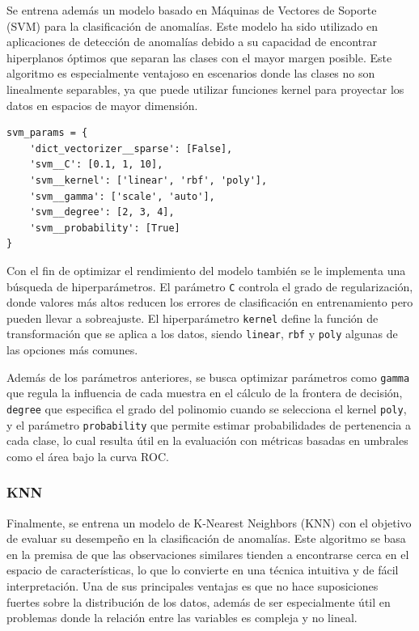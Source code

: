 \documentclass[11pt,a4paper,spanish]{book}
\numberwithin{equation}{chapter}
\numberwithin{figure}{chapter}
\begin{document}
Se entrena además un modelo basado en Máquinas de Vectores de Soporte (SVM) para la 
clasificación de anomalías. Este modelo ha sido utilizado en aplicaciones de detección 
de anomalías debido a su capacidad de encontrar hiperplanos óptimos que separan las 
clases con el mayor margen posible. Este algoritmo es especialmente ventajoso en 
escenarios donde las clases no son linealmente separables, ya que puede utilizar 
funciones kernel para proyectar los datos en espacios de mayor dimensión. 


\vspace{5mm}
\begin{lstlisting}
svm_params = {
    'dict_vectorizer__sparse': [False],
    'svm__C': [0.1, 1, 10],                  
    'svm__kernel': ['linear', 'rbf', 'poly'],
    'svm__gamma': ['scale', 'auto'],         
    'svm__degree': [2, 3, 4],                
    'svm__probability': [True]               
}
\end{lstlisting}


Con el fin de optimizar el rendimiento del modelo también se le implementa una búsqueda 
de hiperparámetros. El parámetro \lstinline|C| controla el grado de regularización, 
donde valores más altos reducen los errores de clasificación en entrenamiento pero 
pueden llevar a sobreajuste. El hiperparámetro \lstinline|kernel| define la función de 
transformación que se aplica a los datos, siendo \lstinline|linear|, \lstinline|rbf| y 
\lstinline|poly| algunas de las opciones más comunes. 


Además de los parámetros anteriores, se busca optimizar parámetros como 
\lstinline|gamma| que regula la influencia de cada muestra en el cálculo de la frontera 
de decisión, \lstinline|degree| que especifica el grado del polinomio cuando se 
selecciona el kernel \lstinline|poly|, y el parámetro \lstinline|probability| que 
permite estimar probabilidades de pertenencia a cada clase, lo cual resulta útil en la 
evaluación con métricas basadas en umbrales como el área bajo la curva ROC. 


\subsubsection{KNN}


Finalmente, se entrena un modelo de K-Nearest Neighbors (KNN) con el objetivo de 
evaluar su desempeño en la clasificación de anomalías. 
Este algoritmo se basa en la premisa de que las observaciones similares tienden a 
encontrarse cerca en el espacio de características, lo que lo convierte en una técnica 
intuitiva y de fácil interpretación. Una de sus principales ventajas es que no hace 
suposiciones fuertes sobre la distribución de los datos, además de ser especialmente 
útil en problemas donde la relación entre las variables es compleja y no lineal.
\end{document}
